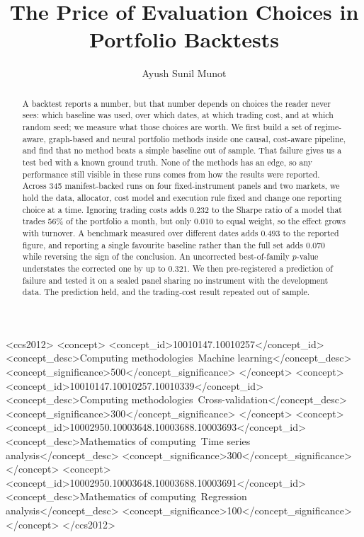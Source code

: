 \documentclass[sigconf,nonacm]{acmart}
\begin{document}
\title{The Price of Evaluation Choices in Portfolio Backtests}

\author{Ayush Sunil Munot}

\begin{abstract}
A backtest reports a number, but that number depends on choices the reader never
sees: which baseline was used, over which dates, at which trading cost, and at
which random seed; we measure what those choices are worth. We first build a set
of regime-aware, graph-based and neural portfolio methods inside one causal,
cost-aware pipeline, and find that no method beats a simple baseline out of
sample. That failure gives us a test bed with a known ground truth. None of the
methods has an edge, so any performance still visible in these runs comes from
how the results were reported. Across 345 manifest-backed runs on four fixed-instrument panels and
two markets, we hold the data, allocator, cost model and execution rule fixed
and change one reporting choice at a time. Ignoring trading costs adds $0.232$
to the Sharpe ratio of a model that trades 56\% of the portfolio a month, but
only $0.010$ to equal weight, so the effect grows with turnover. A benchmark
measured over different dates adds $0.493$ to the reported figure, and reporting
a single favourite baseline rather than the full set adds $0.070$ while
reversing the sign of the conclusion. An uncorrected best-of-family $p$-value understates the
corrected one by up to $0.321$. We then pre-registered a prediction of failure and tested it on a sealed panel sharing no instrument with the
development data. The prediction held, and the trading-cost result repeated out
of sample.
\end{abstract}

\begin{CCSXML}
<ccs2012>
   <concept>
       <concept_id>10010147.10010257</concept_id>
       <concept_desc>Computing methodologies~Machine learning</concept_desc>
       <concept_significance>500</concept_significance>
       </concept>
   <concept>
       <concept_id>10010147.10010257.10010339</concept_id>
       <concept_desc>Computing methodologies~Cross-validation</concept_desc>
       <concept_significance>300</concept_significance>
       </concept>
   <concept>
       <concept_id>10002950.10003648.10003688.10003693</concept_id>
       <concept_desc>Mathematics of computing~Time series analysis</concept_desc>
       <concept_significance>300</concept_significance>
       </concept>
   <concept>
       <concept_id>10002950.10003648.10003688.10003691</concept_id>
       <concept_desc>Mathematics of computing~Regression analysis</concept_desc>
       <concept_significance>100</concept_significance>
       </concept>
 </ccs2012>
\end{CCSXML}
\end{document}
